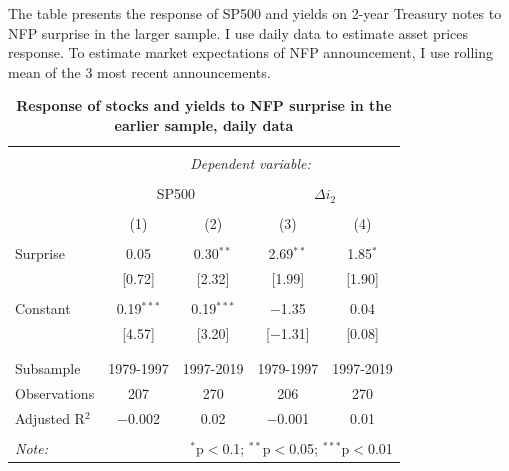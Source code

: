 \documentclass[12pt]{article}
\begin{document}

\begin{table}[!htbp] \centering 
  \caption{\textbf{Response of stocks and yields to NFP surprise in the earlier sample, daily data}} 
  \label{}
      \begin{flushleft}
    {\medskip\small
  The table presents the response of SP500 and yields on 2-year Treasury notes to NFP surprise in the larger sample. I use daily data to estimate asset prices response. To estimate market expectations of NFP announcement, I use rolling mean of the 3 most recent announcements.}
    \medskip
    \end{flushleft}
\begin{tabular}{@{\extracolsep{5pt}}lcccc} 
\\[-1.8ex]\hline 
\hline \\[-1.8ex] 
 & \multicolumn{4}{c}{\textit{Dependent variable:}} \\ 
\cline{2-5} 
\\[-1.8ex] & \multicolumn{2}{c}{SP500} & \multicolumn{2}{c}{$\Delta i_2$} \\ 
\\[-1.8ex] & (1) & (2) & (3) & (4)\\ 
\hline \\[-1.8ex] 
 Surprise & 0.05 & 0.30$^{**}$ & 2.69$^{**}$ & 1.85$^{*}$ \\ 
  & [0.72] & [2.32] & [1.99] & [1.90] \\ 
  & & & & \\ 
 Constant & 0.19$^{***}$ & 0.19$^{***}$ & $-$1.35 & 0.04 \\ 
  & [4.57] & [3.20] & [$-$1.31] & [0.08] \\ 
  & & & & \\ 
\hline \\[-1.8ex] 
Subsample & 1979-1997 & 1997-2019 & 1979-1997 & 1997-2019 \\ 
Observations & 207 & 270 & 206 & 270 \\ 
Adjusted R$^{2}$ & $-$0.002 & 0.02 & $-$0.001 & 0.01 \\ 
\hline 
\hline \\[-1.8ex] 
\textit{Note:}  & \multicolumn{4}{r}{$^{*}$p$<$0.1; $^{**}$p$<$0.05; $^{***}$p$<$0.01} \\ 
\end{tabular} 
\end{table}
\end{document}
